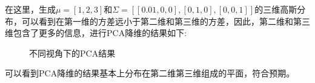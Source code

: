 \documentclass[lang=cn,a4paper,cite=authoryear]{elegantpaper}
\begin{document}
\subsubsection*{}
在这里，生成$\mu=[1, 2, 3]$和$\Sigma=[[0.01, 0, 0], [0, 1, 0], [0, 0, 1]]$的三维高斯分布，可以看到在第一维的方差远小于第二维和第三维的方差，因此，第二维和第三维包含了更多的信息，进行PCA降维的结果如下:
\begin{figure}[H]
	\centering  %
	
	\caption{不同视角下的PCA结果}
	\label{Fig.main}
\end{figure}
可以看到PCA降维的结果基本上分布在第二维第三维组成的平面，符合预期。
\end{document}

